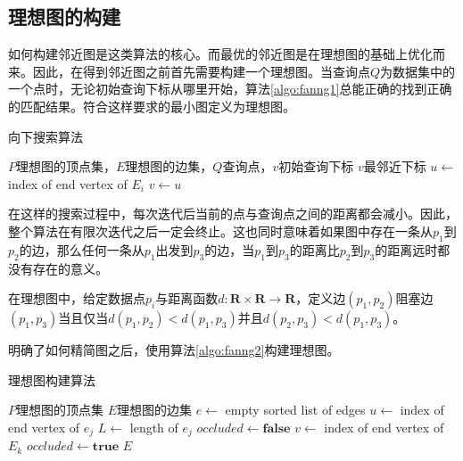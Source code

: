\subsection{理想图的构建}

如何构建邻近图是这类算法的核心。而最优的邻近图是在理想图的基础上优化而来。因此，在得到邻近图之前首先需要构建一个理想图。当查询点$Q$为数据集中的一个点时，无论初始查询下标从哪里开始，算法\ref{algo:fanng1}总能正确的找到正确的匹配结果。符合这样要求的最小图定义为理想图。

\begin{algorithm}
	\caption{向下搜索算法\cite{harwood2016fanng}}
	\label{algo:fanng1}
	\begin{algorithmic}[1] %
		\Require $P$理想图的顶点集，$E$理想图的边集，$Q$查询点，$v$初始查询下标 %
		\Ensure $v$最邻近下标 %
		\State $u\leftarrow$ index of end vertex of $E_i$
		\State $v\leftarrow u$
		\EndIf
		\EndFor
	\end{algorithmic}
\end{algorithm}

在这样的搜索过程中，每次迭代后当前的点与查询点之间的距离都会减小。因此，整个算法在有限次迭代之后一定会终止。这也同时意味着如果图中存在一条从$p_1$到$p_2$的边，那么任何一条从$p_1$出发到$p_3$的边，当$p_1$到$p_3$的距离比$p_2$到$p_3$的距离远时都没有存在的意义。

在理想图中，给定数据点$p_i$与距离函数$d:\mathbf{R}\times \mathbf{R} \rightarrow \mathbf{R}$，定义边$(p_1,p_2)$阻塞边$(p_1,p_3)$当且仅当$d(p_1,p_2)<d(p_1,p_3)$并且$d(p_2,p_3)<d(p_1,p_3)$。

明确了如何精简图之后，使用算法\ref{algo:fanng2}构建理想图。

\begin{algorithm}
	\caption{理想图构建算法\cite{harwood2016fanng}}
	\label{algo:fanng2}
	\begin{algorithmic}[1] %
		\Require $P$理想图的顶点集
		\Ensure $E$理想图的边集 %
		\State $e\leftarrow$ empty sorted list of edges
		\State $u \leftarrow$ index of end vertex of $e_j$
		\State $L \leftarrow$ length of $e_j$
		\State $occluded \leftarrow \mathbf{false}$
		\State $v \leftarrow$ index of end vertex of $E_k$
		\State $occluded \leftarrow \mathbf{true}$
		\EndIf
		\EndFor
		\EndFor
		\EndFor
		\Return $E$
	\end{algorithmic}
\end{algorithm}

